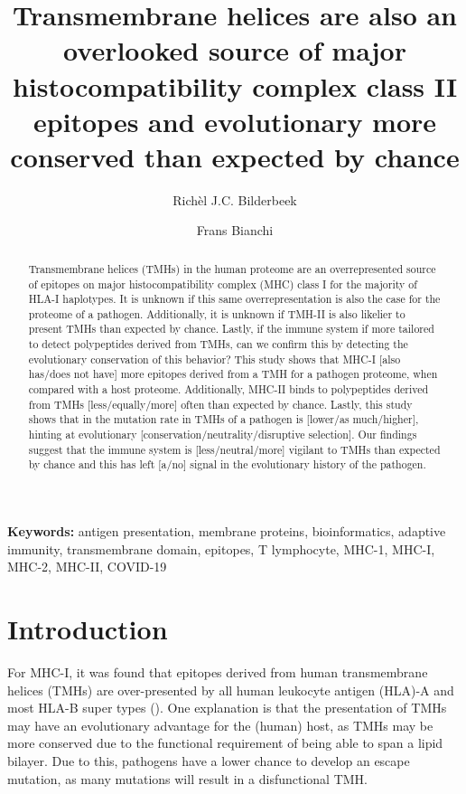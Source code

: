 \documentclass{article}
\title{
  Transmembrane helices are also 
  an overlooked source of major histocompatibility complex class II epitopes
  and evolutionary more conserved than expected by chance
}
\author[1]{Richèl J.C. Bilderbeek}
\author[2]{Frans Bianchi}
\affil[1]{Groningen Institute for Evolutionary Life Sciences, University of 
Groningen, Groningen, The Netherlands}
\affil[2]{Frans' Institute, University of Groningen, Groningen, The Netherlands}
\begin{document}
\maketitle

\begin{abstract}

Transmembrane helices (TMHs) in the human proteome
are an overrepresented source of epitopes on major 
histocompatibility complex (MHC) class I for the majority of HLA-I haplotypes. 
It is unknown if this same overrepresentation
is also the case for the proteome of a pathogen.
Additionally, it is unknown if TMH-II is also likelier to present
TMHs than expected by chance. 
Lastly, if the immune system if more tailored to detect polypeptides
derived from TMHs, can we confirm this by detecting the evolutionary
conservation of this behavior?
This study shows that MHC-I [also has/does not have] more
epitopes derived from a TMH for a pathogen proteome, when compared with
a host proteome.
Additionally, MHC-II binds to polypeptides derived from TMHs 
[less/equally/more] often than expected by chance.
Lastly, this study shows that in the mutation rate in TMHs of a pathogen
is [lower/as much/higher], hinting at 
evolutionary [conservation/neutrality/disruptive selection].
Our findings suggest that the immune system is [less/neutral/more]
vigilant to TMHs than expected by chance and this has left [a/no]
signal in the evolutionary history of the pathogen.

\end{abstract}

{\bf Keywords:} antigen presentation, membrane proteins, bioinformatics, 
adaptive immunity, transmembrane domain, epitopes, T lymphocyte, 
MHC-1, MHC-I, MHC-2, MHC-II, COVID-19

\section{Introduction}

For MHC-I, it was found that epitopes derived 
from human transmembrane helices (TMHs)
are over-presented by all human leukocyte antigen (HLA)-A and 
most HLA-B super types (\cite{bianchi2017}). 
One explanation is that the presentation of TMHs 
may have an evolutionary advantage for 
the (human) host, as TMHs may be more 
conserved due to the functional requirement of being able to span a lipid 
bilayer. 
Due to this, pathogens have a lower chance to develop an escape mutation,
as many mutations will result in a disfunctional TMH.
\end{document}
